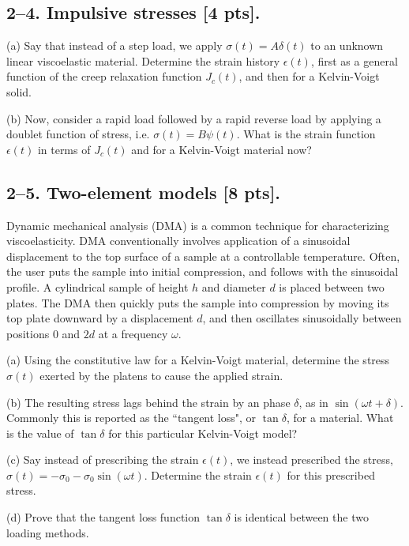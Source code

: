\bigskip
\subsection*{2--4. \textbf{Impulsive stresses} [4 pts].}

(a) Say that instead of a step load, we apply $\sigma(t) = A \delta(t)$ to an unknown linear viscoelastic material. 
Determine the strain history $\epsilon(t)$, first as a general function of the creep relaxation function $J_c(t)$, and then for a Kelvin-Voigt solid. 

(b) Now, consider a rapid load followed by a rapid reverse load by applying a doublet function of stress, i.e. $\sigma(t) = B \psi(t)$. 
What is the strain function $\epsilon(t)$ in terms of $J_c(t)$ and for a Kelvin-Voigt material now? 


\bigskip
\subsection*{2--5. \textbf{Two-element models} [8 pts].}

Dynamic mechanical analysis (DMA) is a common technique for characterizing viscoelasticity. 
DMA conventionally involves application of a sinusoidal displacement to the top surface of a sample at a controllable temperature. 
Often, the user puts the sample into initial compression, and follows with the sinusoidal profile. 
A cylindrical sample of height $h$ and diameter $d$ is placed between two plates.
The DMA then quickly puts the sample into compression by moving its top plate downward by a displacement $d$, and then oscillates sinusoidally between positions $0$ and $2d$ at a frequency $\omega$.

\medskip
(a) Using the constitutive law for a Kelvin-Voigt material, determine the stress $\sigma(t)$ exerted by the platens to cause the applied strain. 

\medskip
(b) The resulting stress lags behind the strain by an phase $\delta$, as in $\sin(\omega t + \delta)$. 
Commonly this is reported as the ``tangent loss", or $\tan\delta$, for a material. 
What is the value of $\tan\delta$ for this particular Kelvin-Voigt model?

\medskip
(c) Say instead of prescribing the strain $\epsilon(t)$, we instead prescribed the stress, $\sigma(t) = - \sigma_0 - \sigma_0 \sin(\omega t)$. 
Determine the strain $\epsilon(t)$ for this prescribed stress.

\medskip
(d) Prove that the tangent loss function $\tan\delta$ is identical between the two loading methods.





